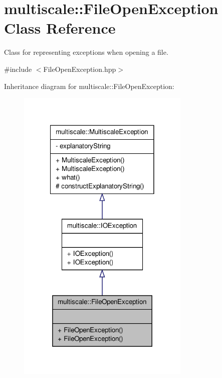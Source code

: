 \hypertarget{classmultiscale_1_1FileOpenException}{\section{multiscale\-:\-:\-File\-Open\-Exception \-Class \-Reference}
\label{classmultiscale_1_1FileOpenException}
}


\-Class for representing exceptions when opening a file.  




{\ttfamily \#include $<$\-File\-Open\-Exception.\-hpp$>$}



\-Inheritance diagram for multiscale\-:\-:\-File\-Open\-Exception\-:\nopagebreak
\begin{figure}[H]
\begin{center}
\leavevmode
\includegraphics[width=234pt]{classmultiscale_1_1FileOpenException__inherit__graph}
\end{center}
\end{figure}


